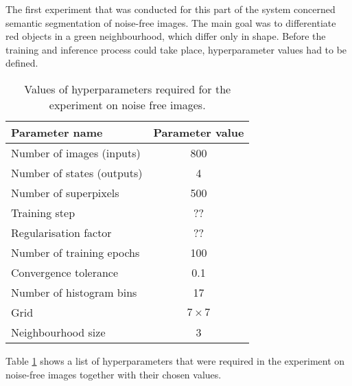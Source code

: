 The first experiment that was conducted for this part of the system concerned semantic segmentation of noise-free images. The main goal was to differentiate red objects in a green neighbourhood, which differ only in shape. Before the training and inference process could take place, hyperparameter values had to be defined. 
\begin{table}[ht]
    \caption{Values of hyperparameters required for the experiment on noise free images.}
    \centering
    \begin{tabular}{|l|c|}
        \hline
        \rowcolor[HTML]{C0C0C0} 
        \textbf{Parameter name} & \textbf{Parameter value} \\ \hline
        Number of images (inputs) & 800 \\ \hline
        Number of states (outputs) & 4 \\ \hline
        Number of superpixels & 500 \\ \hline
        Training step & ?? \\ \hline
        Regularisation factor & ?? \\ \hline
        Number of training epochs & 100 \\ \hline
        Convergence tolerance & 0.1 \\ \hline
        Number of histogram bins & 17 \\ \hline
        Grid & $7 \times 7$ \\ \hline
        Neighbourhood size & 3 \\ \hline
    \end{tabular}
    \label{table:hyperparameters_nonlinear_noise_free}
\end{table}
Table \ref{table:hyperparameters_nonlinear_noise_free} shows a list of hyperparameters that were required in the experiment on noise-free images together with their chosen values.